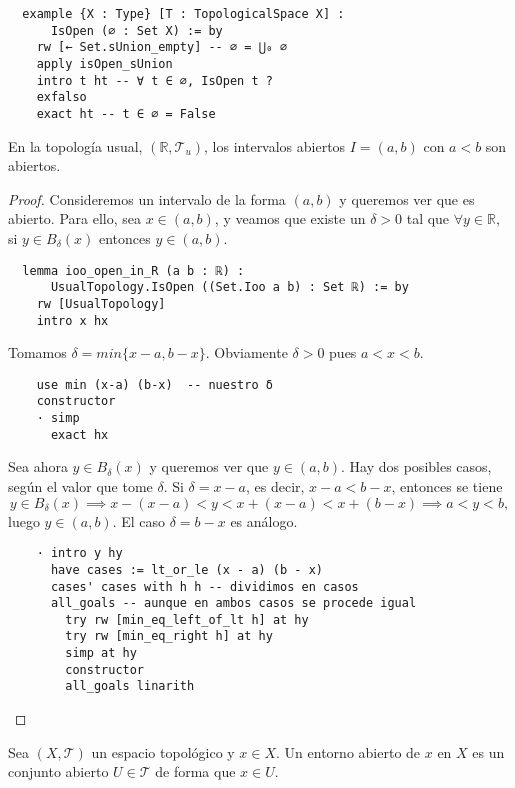 \begin{lstlisting}
  example {X : Type} [T : TopologicalSpace X] :
      IsOpen (∅ : Set X) := by
    rw [← Set.sUnion_empty] -- ∅ = ⋃₀ ∅
    apply isOpen_sUnion
    intro t ht -- ∀ t ∈ ∅, IsOpen t ?
    exfalso
    exact ht -- t ∈ ∅ = False
\end{lstlisting}
  
\begin{example}\label{ejemplo:intervalos-abiertos}
  En la topología usual, $(\mathbb{R}, \mathcal{T}_u)$, los intervalos abiertos $I = (a, b)$ con $a < b$ son abiertos.
\end{example}

\begin{proof}
  Consideremos un intervalo de la forma $(a, b)$ y queremos ver que es abierto. Para ello, sea $x \in (a, b)$, y veamos que existe un $\delta >0$ tal que $\forall y \in \mathbb{R}$, si $y \in B_\delta(x)$ entonces $y \in (a, b)$.

  \begin{lstlisting}
  lemma ioo_open_in_R (a b : ℝ) :
      UsualTopology.IsOpen ((Set.Ioo a b) : Set ℝ) := by
    rw [UsualTopology]
    intro x hx \end{lstlisting}

  Tomamos $\delta = min \{x-a, b-x\}$. Obviamente $\delta >0$ pues $a < x < b$.

  \begin{lstlisting}
    use min (x-a) (b-x)  -- nuestro δ
    constructor
    · simp
      exact hx \end{lstlisting}

  Sea ahora $y \in B_\delta(x)$ y queremos ver que $y \in (a, b)$. Hay dos posibles casos, según el valor que tome $\delta$. Si $\delta = x-a$, es decir, $x-a < b -x$, entonces se tiene
  $$
  y \in B_\delta(x) \implies x - (x - a) < y < x + (x - a) < x + (b - x) \implies a < y < b,
  $$
  luego $y \in (a, b)$. El caso $\delta = b -x$ es análogo.

  \begin{lstlisting}
    · intro y hy
      have cases := lt_or_le (x - a) (b - x)
      cases' cases with h h -- dividimos en casos
      all_goals -- aunque en ambos casos se procede igual
        try rw [min_eq_left_of_lt h] at hy
        try rw [min_eq_right h] at hy
        simp at hy
        constructor
        all_goals linarith \end{lstlisting}
\end{proof}

\begin{definition}
  Sea $(X, \mathcal{T})$ un espacio topológico y $x \in X$. Un \textnormal{entorno abierto} de $x$ en $X$ es un conjunto abierto $U \in \mathcal{T}$ de forma que $x \in U$.
\end{definition}


